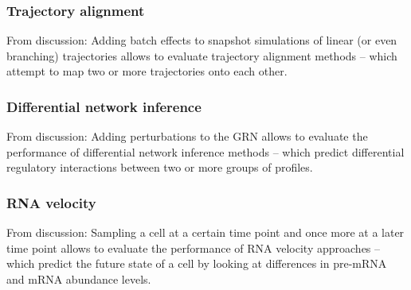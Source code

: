 \subsubsection{Trajectory alignment}
From discussion: Adding batch effects to snapshot simulations of linear (or even branching) trajectories allows to evaluate trajectory alignment methods -- which attempt to map two or more trajectories onto each other. 
\subsubsection{Differential network inference}
From discussion: Adding perturbations to the GRN allows to evaluate the performance of differential network inference methods -- which predict differential regulatory interactions between two or more groups of profiles.
\subsubsection{RNA velocity}
From discussion: Sampling a cell at a certain time point and once more at a later time point allows to evaluate the performance of RNA velocity approaches -- which predict the future state of a cell by looking at differences in pre-mRNA and mRNA abundance levels.








